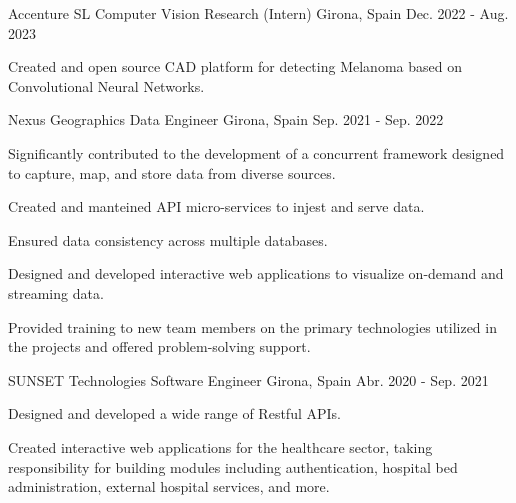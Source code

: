 \begin{cventries}
    \cventry
    {Accenture SL} %
    {Computer Vision Research (Intern)} %
    {Girona, Spain} %
    {Dec. 2022 - Aug. 2023} %
    {
    \begin{cvitems}
    \item{Created and open source CAD platform for detecting Melanoma based on Convolutional Neural Networks.}
    \end{cvitems}
    }

      \cventry
      {Nexus Geographics} %
      {Data Engineer} %
      {Girona, Spain} %
      {Sep. 2021 - Sep. 2022} %
      {
        \begin{cvitems}
        \item {Significantly contributed to the development of a concurrent
          framework designed to capture, map, and store data from diverse
        sources.}
        \item {Created and manteined API micro-services to injest and serve data.}
        \item {Ensured data consistency across multiple databases.}
        \item {Designed and developed interactive web applications to visualize
          on-demand and streaming data.}
        \item {Provided training to new team members on the primary
          technologies utilized in the projects and offered problem-solving
        support.}
        \end{cvitems}
      }


      \cventry
      {SUNSET Technologies} %
      {Software Engineer} %
      {Girona, Spain} %
      {Abr. 2020 - Sep. 2021} %
      {
        \begin{cvitems}
        \item {Designed and developed a wide range of Restful APIs.}
        \item {Created interactive web applications for the healthcare sector,
          taking responsibility for building modules including authentication,
        hospital bed administration, external hospital services, and more.}
        \end{cvitems}
      }

  \end{cventries}
